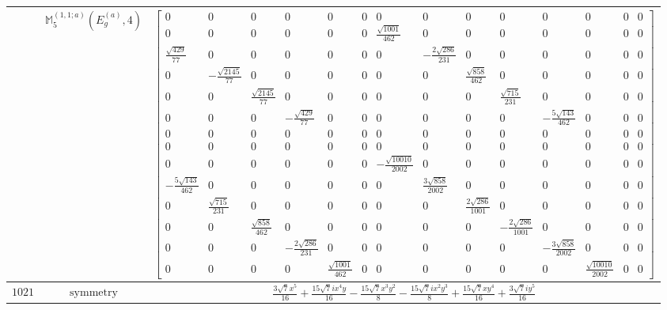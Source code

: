 \documentclass[fleqn,8pt,landscape]{jsarticle}
\begin{document}
\begin{longtable}{ccc}
$  $ & $ \mathbb{M}_{5}^{(1,1;a)}(E_{g}^{(a)},4) $ & $ \begin{bmatrix} 0 & 0 & 0 & 0 & 0 & 0 & 0 & 0 & 0 & 0 & 0 & 0 & 0 & 0 \\ 0 & 0 & 0 & 0 & 0 & 0 & \frac{\sqrt{1001}}{462} & 0 & 0 & 0 & 0 & 0 & 0 & 0 \\ \frac{\sqrt{429}}{77} & 0 & 0 & 0 & 0 & 0 & 0 & - \frac{2 \sqrt{286}}{231} & 0 & 0 & 0 & 0 & 0 & 0 \\ 0 & - \frac{\sqrt{2145}}{77} & 0 & 0 & 0 & 0 & 0 & 0 & \frac{\sqrt{858}}{462} & 0 & 0 & 0 & 0 & 0 \\ 0 & 0 & \frac{\sqrt{2145}}{77} & 0 & 0 & 0 & 0 & 0 & 0 & \frac{\sqrt{715}}{231} & 0 & 0 & 0 & 0 \\ 0 & 0 & 0 & - \frac{\sqrt{429}}{77} & 0 & 0 & 0 & 0 & 0 & 0 & - \frac{5 \sqrt{143}}{462} & 0 & 0 & 0 \\ 0 & 0 & 0 & 0 & 0 & 0 & 0 & 0 & 0 & 0 & 0 & 0 & 0 & 0 \\ 0 & 0 & 0 & 0 & 0 & 0 & 0 & 0 & 0 & 0 & 0 & 0 & 0 & 0 \\ 0 & 0 & 0 & 0 & 0 & 0 & - \frac{\sqrt{10010}}{2002} & 0 & 0 & 0 & 0 & 0 & 0 & 0 \\ - \frac{5 \sqrt{143}}{462} & 0 & 0 & 0 & 0 & 0 & 0 & \frac{3 \sqrt{858}}{2002} & 0 & 0 & 0 & 0 & 0 & 0 \\ 0 & \frac{\sqrt{715}}{231} & 0 & 0 & 0 & 0 & 0 & 0 & \frac{2 \sqrt{286}}{1001} & 0 & 0 & 0 & 0 & 0 \\ 0 & 0 & \frac{\sqrt{858}}{462} & 0 & 0 & 0 & 0 & 0 & 0 & - \frac{2 \sqrt{286}}{1001} & 0 & 0 & 0 & 0 \\ 0 & 0 & 0 & - \frac{2 \sqrt{286}}{231} & 0 & 0 & 0 & 0 & 0 & 0 & - \frac{3 \sqrt{858}}{2002} & 0 & 0 & 0 \\ 0 & 0 & 0 & 0 & \frac{\sqrt{1001}}{462} & 0 & 0 & 0 & 0 & 0 & 0 & \frac{\sqrt{10010}}{2002} & 0 & 0 \end{bmatrix} $ \\ \hline
$ 1021 $ & $ \text{symmetry} $ & $ \frac{3 \sqrt{7} x^{5}}{16} + \frac{15 \sqrt{7} i x^{4} y}{16} - \frac{15 \sqrt{7} x^{3} y^{2}}{8} - \frac{15 \sqrt{7} i x^{2} y^{3}}{8} + \frac{15 \sqrt{7} x y^{4}}{16} + \frac{3 \sqrt{7} i y^{5}}{16} $ \\

\end{longtable}
\end{document}

